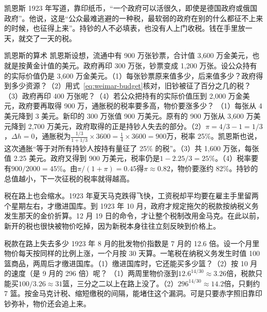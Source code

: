 凯恩斯 1923 年写道，靠印纸币，“一个政府可以活很久，即使是德国政府或俄国政府”\cite{keynes1923}。他说，这是“公众最难逃避的一种税，最软弱的政府在别的什么都征不上来的时候，也征得上来”\cite{keynes1923}。持钞的人不必填表，也没有人上门收税。钱在手里放一天，就交了一天的税。

\begin{example}{凯恩斯的算术}\label{ex:weimar-seigniorage}
凯恩斯设想，流通中有 900 万张钞票，合计值 3,600 万金美元，也就是按黄金计值的美元。政府再印 300 万张，钞票变成 1,200 万张\cite{keynes1923}。设公众持有的实际价值仍是 3,600 万金美元。（1）每张钞票原来值多少，后来值多少？政府得到多少资源？（2）用式~\eqref{eq:weimar-budget}核对，旧钞被征了百分之几的税？（3）政府再印 400 万张呢？（4）若公众把持有的实际价值压到 2,000 万金美元，政府要再取得 900 万，通胀税的税率要多高，物价要涨多少？
\solution （1）每张从 4 美元降到 3 美元。新印的 300 万张值 900 万美元。原有的 900 万张从 3,600 万美元降到 2,700 万美元，政府取得的正是持钞人失去的部分。（2）$\pi=4/3-1=1/3$，$\Delta h=0$，通胀税为$\frac{1/3}{1+1/3}\times3600=\frac14\times3600=900$万，税率 25\%。凯恩斯也说，这次通胀“等于对所有持钞人按持有量征了 25\% 的税”\cite{keynes1923}。（3）共 1,600 万张，每张值 2.25 美元。政府又得到 900 万美元，税率仍是$1-2.25/3=25\%$。（4）税率要有$900/2000=45\%$。由$\pi/(1+\pi)=0.45$得$\pi\approx0.82$，物价要涨约 82\%。持钞的总值越小，下一次征税的税率就得越高\cite{keynes1923}。
\end{example}

税在路上也会缩水。1923 年夏天马克跌得飞快，工资税却平均要在雇主手里留两个星期左右，才缴进国库\cite{bresciani1937}。到 1923 年 10 月，政府才规定拖欠的税款按纳税义务发生那天的金价折算。12 月 19 日的命令，才让整个税制改用金马克\cite{bresciani1937}。在此以前，新开的税也很快被物价吃掉，因为新税本身往往立刻反映到价格上\cite{bresciani1937}。

\begin{example}{税款在路上失去多少}\label{ex:weimar-taxlag}
1923 年 8 月的批发物价指数是 7 月的 12.6 倍\cite{sargent1982}。设一个月里物价每天按同样的比例上涨，一个月按 30 天算。一笔税在纳税义务发生时值 100 篮商品，两周后才缴进国库。（1）缴进国库时，它还能买多少篮？（2）按 10 月的速度（是 9 月的 296 倍）呢？
\solution （1）两周里物价涨到$12.6^{14/30}\approx3.26$倍，税款只能买$100/3.26\approx31$篮，三分之二以上在路上没了。（2）$296^{14/30}\approx14.2$倍，只剩约 7 篮。按金马克计税、缩短缴税的间隔，能堵住这个漏洞。可是只要赤字照旧靠印钞弥补，物价还会追上来。
\end{example}

